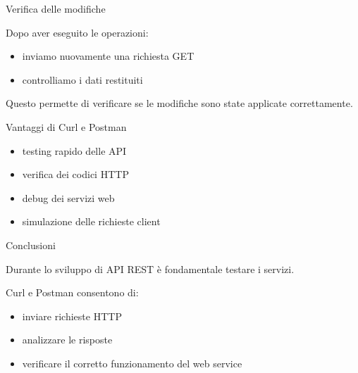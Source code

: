 \documentclass{beamer}
\begin{document}
	
	\begin{frame}{Verifica delle modifiche}
		
		Dopo aver eseguito le operazioni:
		
		\begin{itemize}
			\item inviamo nuovamente una richiesta GET
			\item controlliamo i dati restituiti
		\end{itemize}
		
		Questo permette di verificare se le modifiche sono state applicate correttamente.
		
	\end{frame}
	
	
	\begin{frame}{Vantaggi di Curl e Postman}
		
		\begin{itemize}
			\item testing rapido delle API
			\item verifica dei codici HTTP
			\item debug dei servizi web
			\item simulazione delle richieste client
		\end{itemize}
		
	\end{frame}
	
	
	\begin{frame}{Conclusioni}
		
		Durante lo sviluppo di API REST è fondamentale testare i servizi.
		
		\bigskip
		
		Curl e Postman consentono di:
		
		\begin{itemize}
			\item inviare richieste HTTP
			\item analizzare le risposte
			\item verificare il corretto funzionamento del web service
		\end{itemize}
		
	\end{frame}
	
\end{document}
